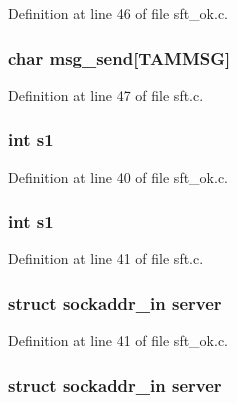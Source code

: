 Definition at line 46 of file sft\_\-ok.c.

\hypertarget{group__tools_gaf535bd429e84ab4b380e215d1fda88c9}{
\subsubsection[{msg\_\-send}]{\setlength{\rightskip}{0pt plus 5cm}char {\bf msg\_\-send}\mbox{[}TAMMSG\mbox{]}}}
\label{group__tools_gaf535bd429e84ab4b380e215d1fda88c9}


Definition at line 47 of file sft.c.

\hypertarget{group__tools_gacfb6b9e2b00e34da4313b463c341e597}{
\subsubsection[{s1}]{\setlength{\rightskip}{0pt plus 5cm}int {\bf s1}}}
\label{group__tools_gacfb6b9e2b00e34da4313b463c341e597}


Definition at line 40 of file sft\_\-ok.c.

\hypertarget{group__tools_gacfb6b9e2b00e34da4313b463c341e597}{
\subsubsection[{s1}]{\setlength{\rightskip}{0pt plus 5cm}int {\bf s1}}}
\label{group__tools_gacfb6b9e2b00e34da4313b463c341e597}


Definition at line 41 of file sft.c.

\hypertarget{group__tools_ga437cecc27162b023659813375ca67d62}{
\subsubsection[{server}]{\setlength{\rightskip}{0pt plus 5cm}struct sockaddr\_\-in {\bf server}}}
\label{group__tools_ga437cecc27162b023659813375ca67d62}


Definition at line 41 of file sft\_\-ok.c.

\hypertarget{group__tools_ga437cecc27162b023659813375ca67d62}{
\subsubsection[{server}]{\setlength{\rightskip}{0pt plus 5cm}struct sockaddr\_\-in {\bf server}}}
\label{group__tools_ga437cecc27162b023659813375ca67d62}


